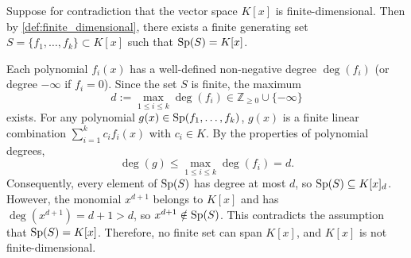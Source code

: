 \begin{exercisesolution}
\label{sol:polynomial_space_infinite_dim}
Suppose for contradiction that the vector space $K[x]$ is finite-dimensional. Then by \cref{def:finite_dimensional}, there exists a finite generating set $S = \{f_1, \dots, f_k\} \subset K[x]$ such that $\operatorname{Sp}(S) = K[x]$.

Each polynomial $f_i(x)$ has a well-defined non-negative degree $\deg(f_i)$ (or degree $-\infty$ if $f_i = 0$). Since the set $S$ is finite, the maximum
\[
d := \max_{1 \le i \le k} \deg(f_i) \in \mathbb{Z}_{\ge 0} \cup \{-\infty\}
\]
exists. For any polynomial $g(x) \in \operatorname{Sp}(f_1, \dots, f_k)$, $g(x)$ is a finite linear combination $\sum_{i=1}^k c_i f_i(x)$ with $c_i \in K$. By the properties of polynomial degrees,
\[
\deg(g) \le \max_{1 \le i \le k} \deg(f_i) = d.
\]
Consequently, every element of $\operatorname{Sp}(S)$ has degree at most $d$, so $\operatorname{Sp}(S) \subseteq K[x]_d$.
However, the monomial $x^{d+1}$ belongs to $K[x]$ and has $\deg(x^{d+1}) = d + 1 > d$, so $x^{d+1} \notin \operatorname{Sp}(S)$.
This contradicts the assumption that $\operatorname{Sp}(S) = K[x]$. Therefore, no finite set can span $K[x]$, and $K[x]$ is not finite-dimensional.
\end{exercisesolution}

